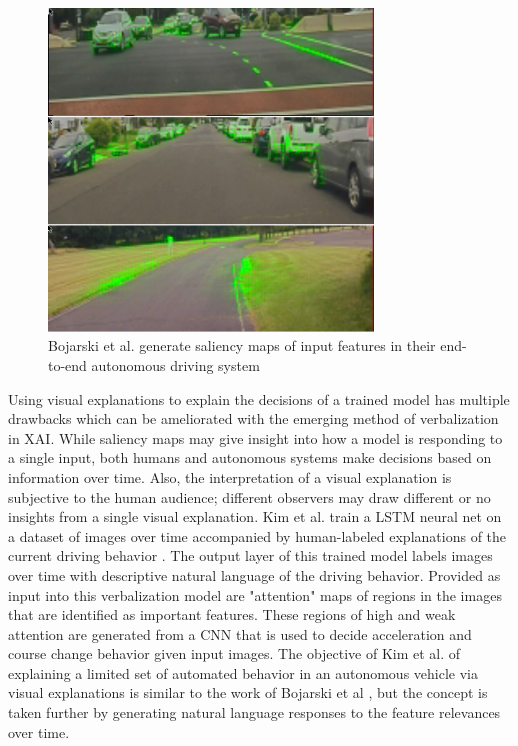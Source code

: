 \begin{figure}
    \centering
    \includegraphics[width=3.4in]{media/bojarski2017.png}
    \caption{Bojarski et al. generate saliency maps of input features in their end-to-end autonomous driving system \cite{Bojarski2017ExplainingHA}}
    \label{fig:bojarski2017}
\end{figure}

Using visual explanations to explain the decisions of a trained model has multiple drawbacks which can be ameliorated with the emerging method of verbalization in XAI.  While saliency maps may give insight into how a model is responding to a single input, both humans and autonomous systems make decisions based on information over time.  Also, the interpretation of a visual explanation is subjective to the human audience; different observers may draw different or no insights from a single visual explanation.  Kim et al. train a LSTM neural net on a dataset of images over time accompanied by human-labeled explanations of the current driving behavior \cite{kim2018textual}.  The output layer of this trained model labels images over time with descriptive natural language of the driving behavior.  Provided as input into this verbalization model are "attention" maps of regions in the images that are identified as important features.  These regions of high and weak attention are generated from a CNN that is used to decide acceleration and course change behavior given input images.  The objective of Kim et al. of explaining a limited set of automated behavior in an autonomous vehicle via visual explanations is similar to the work of Bojarski et al \cite{Bojarski2017ExplainingHA}, but the concept is taken further by generating natural language responses to the feature relevances over time.

